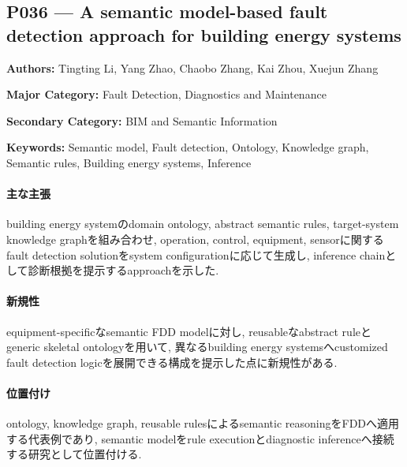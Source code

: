 \subsection{P036 --- A semantic model-based fault detection approach for building energy systems}
\label{paper:P036}
\textbf{Authors:} Tingting Li, Yang Zhao, Chaobo Zhang, Kai Zhou, Xuejun Zhang\par
\textbf{Major Category:} Fault Detection, Diagnostics and Maintenance\par
\textbf{Secondary Category:} BIM and Semantic Information\par
\textbf{Keywords:} Semantic model, Fault detection, Ontology, Knowledge graph, Semantic rules, Building energy systems, Inference\par
\paragraph{主な主張}
building energy systemのdomain ontology, abstract semantic rules, target-system knowledge graphを組み合わせ, operation, control, equipment, sensorに関するfault detection solutionをsystem configurationに応じて生成し, inference chainとして診断根拠を提示するapproachを示した. \cite{Li:2022SemanticFDD}
\paragraph{新規性}
equipment-specificなsemantic FDD modelに対し, reusableなabstract ruleとgeneric skeletal ontologyを用いて, 異なるbuilding energy systemsへcustomized fault detection logicを展開できる構成を提示した点に新規性がある.
\paragraph{位置付け}
ontology, knowledge graph, reusable rulesによるsemantic reasoningをFDDへ適用する代表例であり, semantic modelをrule executionとdiagnostic inferenceへ接続する研究として位置付ける.
